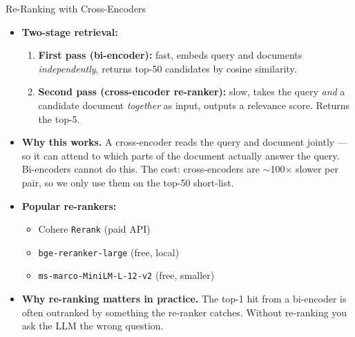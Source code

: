 \documentclass[10pt,english,aspectratio=169]{beamer}
\begin{document}
\begin{frame}{Re-Ranking with Cross-Encoders}
\begin{itemize}
\item \textbf{Two-stage retrieval:}
\begin{enumerate}
    \item \textbf{First pass (bi-encoder):} fast, embeds query and documents \emph{independently}, returns top-50 candidates by cosine similarity.
    \item \textbf{Second pass (cross-encoder re-ranker):} slow, takes the query \emph{and} a candidate document \emph{together} as input, outputs a relevance score. Returns the top-5.
\end{enumerate}

\medskip
\item \textbf{Why this works.} A cross-encoder reads the query and document jointly --- so it can attend to which parts of the document actually answer the query. Bi-encoders cannot do this. The cost: cross-encoders are $\sim$100$\times$ slower per pair, so we only use them on the top-50 short-list.

\medskip
\item \textbf{Popular re-rankers:}
\begin{itemize}
    \item Cohere \texttt{Rerank} (paid API)
    \item \texttt{bge-reranker-large} (free, local)
    \item \texttt{ms-marco-MiniLM-L-12-v2} (free, smaller)
\end{itemize}

\medskip
\item \textbf{Why re-ranking matters in practice.} The top-1 hit from a bi-encoder is often outranked by something the re-ranker catches. Without re-ranking you ask the LLM the wrong question.
\end{itemize}
\end{frame}
\end{document}
